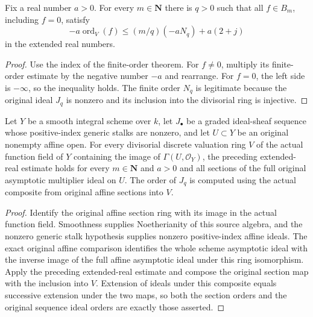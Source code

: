 \begin{corollary}
\label{cor:c0n-actual-ereal-log-bound}
\leanok
Fix a real number $a>0$.  For every $m\in\mathbf N$ there is $q>0$ such
that all $f\in B_m$, including $f=0$, satisfy
\[
 -a\operatorname{ord}_V(f)\le
 (m/q)(-aN_q)+a(2+j)
\]
in the extended real numbers.
\end{corollary}
\begin{proof}
Use the index of the finite-order theorem.  For $f\ne0$, multiply its
finite-order estimate by the negative number $-a$ and rearrange.
For $f=0$, the left side is $-\infty$, so the inequality holds.
The finite order $N_q$ is legitimate because the original ideal $J_q$
is nonzero and its inclusion into the divisorial ring is injective.
\end{proof}

\begin{corollary}
\label{cor:c0n-original-scheme-ereal-log-bound}
\leanok
Let $Y$ be a smooth integral scheme over $k$, let $J_\bullet$ be a graded
ideal-sheaf sequence whose positive-index generic stalks are nonzero,
and let $U\subset Y$ be an original nonempty affine open.  For every
divisorial discrete valuation ring $V$ of the actual function field of $Y$
containing the image of $\Gamma(U,\mathcal O_Y)$, the preceding
extended-real estimate holds for every $m\in\mathbf N$ and $a>0$ and all
sections of the full original
asymptotic multiplier ideal on $U$.  The order of $J_q$ is computed using
the actual composite from original affine sections into $V$.
\end{corollary}
\begin{proof}
Identify the original affine section ring with its image in the actual
function field.  Smoothness supplies Noetherianity of this source algebra,
and the nonzero generic stalk hypothesis supplies nonzero positive-index
affine ideals.  The exact original affine comparison identifies the
whole scheme asymptotic ideal with the inverse image of the full affine
asymptotic ideal under this ring isomorphism.  Apply the preceding
extended-real estimate and compose the original section map with the
inclusion into $V$.  Extension of ideals under this composite equals
successive extension under the two maps, so both the section orders and
the original sequence ideal orders are exactly those asserted.
\end{proof}

